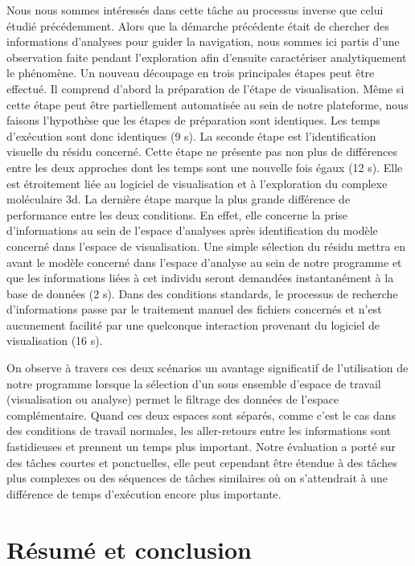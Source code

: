 Nous nous sommes intéressés dans cette tâche au processus inverse que celui étudié précédemment. Alors que la démarche précédente était de chercher des informations d'analyses pour guider la navigation, nous sommes ici partis d'une observation faite pendant l'exploration afin d'ensuite caractériser analytiquement le phénomène.
Un nouveau découpage en trois principales étapes peut être effectué. Il comprend d'abord la préparation de l'étape de visualisation. Même si cette étape peut être partiellement automatisée au sein de notre plateforme, nous faisons l'hypothèse que les étapes de préparation sont identiques. Les temps d'exécution sont donc identiques (9 s).
La seconde étape est l'identification visuelle du résidu concerné. Cette étape ne présente pas non plus de différences entre les deux approches dont les temps sont une nouvelle fois égaux (12 s). Elle est étroitement liée au logiciel de visualisation et à l'exploration du complexe moléculaire 3d.
La dernière étape marque la plus grande différence de performance entre les deux conditions. En effet, elle concerne la prise d'informations au sein de l'espace d'analyses après identification du modèle concerné dans l'espace de visualisation. Une simple sélection du résidu mettra en avant le modèle concerné dans l'espace d'analyse au sein de notre programme et que les informations liées à cet individu seront demandées instantanément à la base de données (2 s). Dans des conditions standards, le processus de recherche d'informations passe par le traitement manuel des fichiers concernés et n'est aucunement facilité par une quelconque interaction provenant du logiciel de visualisation (16 s).

On observe à travers ces deux scénarios un avantage significatif de l'utilisation de notre programme lorsque la sélection d'un sous ensemble d'espace de travail (visualisation ou analyse) permet le filtrage des données de l'espace complémentaire. Quand ces deux espaces sont séparés, comme c'est le cas dans des conditions de travail normales, les aller-retours entre les informations sont fastidieuses et prennent un temps plus important. Notre évaluation a porté sur des tâches courtes et ponctuelles, elle peut cependant être étendue à des tâches plus complexes ou des séquences de tâches similaires où on s'attendrait à une différence de temps d'exécution encore plus importante.

\section{Résumé et conclusion}
\label{sec:ConclusionVisuAna}


